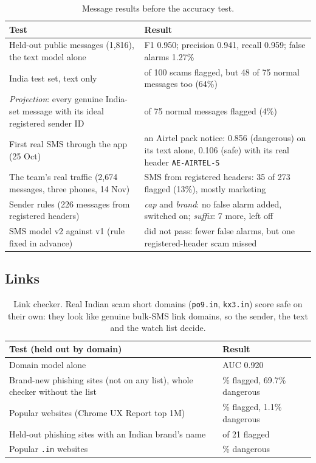 \documentclass[11pt,a4paper]{article}
\newcommand{\code}[1]{\texttt{#1}}
\begin{document}
\begin{table}[H]
\centering\small
\begin{tabularx}{\textwidth}{@{}>{\raggedright\arraybackslash}X>{\raggedright\arraybackslash}p{7.2cm}@{}}
\toprule
\textbf{Test} & \textbf{Result}\\
\midrule
Held-out public messages (1,816), the text model alone & F1 0.950; precision 0.941, recall 0.959; false alarms 1.27\%\\
India test set, text only & 94 of 100 scams flagged, but 48 of 75 normal messages too (64\%)\\
\emph{Projection}: every genuine India-set message with its ideal registered sender ID & 3 of 75 normal messages flagged (4\%)\\
First real SMS through the app (25 Oct) & an Airtel pack notice: 0.856 (dangerous) on its text alone, 0.106 (safe) with its real header \code{AE-AIRTEL-S}\\
The team's real traffic (2,674 messages, three phones, 14 Nov) & SMS from registered headers: 35 of 273 flagged (13\%), mostly marketing\\
Sender rules (226 messages from registered headers) & \emph{cap} and \emph{brand}: no false alarm added, switched on; \emph{suffix}: 7 more, left off\\
SMS model v2 against v1 (rule fixed in advance) & did not pass: fewer false alarms, but one registered-header scam missed\\
\bottomrule
\end{tabularx}
\caption{Message results before the accuracy test.}
\end{table}

\subsection{Links}

\begin{table}[H]
\centering\small
\begin{tabularx}{\textwidth}{@{}>{\raggedright\arraybackslash}X>{\raggedright\arraybackslash}p{6.4cm}@{}}
\toprule
\textbf{Test (held out by domain)} & \textbf{Result}\\
\midrule
Domain model alone & AUC 0.920\\
Brand-new phishing sites (not on any list), whole checker without the list & 80.9\% flagged, 69.7\% dangerous\\
Popular websites (Chrome UX Report top 1M) & 7.6\% flagged, 1.1\% dangerous\\
Held-out phishing sites with an Indian brand's name & 20 of 21 flagged\\
Popular \code{.in} websites & 0.3\% dangerous\\
\bottomrule
\end{tabularx}
\caption{Link checker. Real Indian scam short domains (\code{po9.in}, \code{kx3.in}) score safe on their own: they look like
genuine bulk-SMS link domains, so the sender, the text and the watch list decide.}
\end{table}
\end{document}

